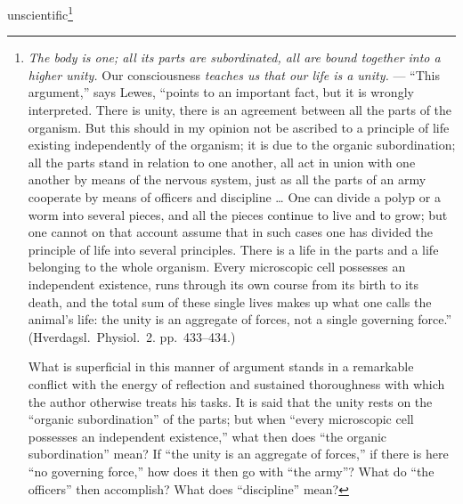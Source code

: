 \documentclass[12pt,a4paper]{book}
\begin{document}
unscientific\footnote{\emph{The body is one; all its parts are subordinated,
all are bound together into a higher unity.} Our consciousness \emph{teaches us
that our life is a unity.} --- ``This argument,'' says Lewes, ``points to an
important fact, but it
is wrongly interpreted. There is unity, there is an agreement between all the
parts of the organism. But this should in my opinion not be ascribed to a
principle of life existing independently of the organism; it is due to the
organic subordination; all the parts stand in relation to one another, all act
in union with one another by means of the nervous system, just as all the parts
of an army cooperate by means of officers and discipline \dots{} One can divide
a polyp or a worm into several pieces, and all the pieces continue to live and
to grow; but one cannot on that account assume that in such cases one has
divided the principle of life into several principles. There is a life in the
parts and a life belonging to the whole organism. Every microscopic cell
possesses an independent existence, runs through its own course from its birth
to its death, and the total sum of these single lives makes up what one calls
the animal's life: the unity is an aggregate of forces, not a single governing
force.'' (Hverdagsl.\ Physiol.\ 2. pp.~433--434.)

What is superficial in this manner of argument stands in a remarkable conflict
with the energy of reflection and sustained thoroughness with which the author
otherwise treats his tasks. It is said that the unity rests on the ``organic
subordination'' of the parts; but when ``every microscopic cell possesses an
independent existence,'' what then does ``the organic subordination'' mean? If
``the unity is an aggregate of forces,'' if there is here ``no governing
force,'' how does it then go with ``the army''? What do ``the officers'' then
accomplish? What does ``discipline'' mean?

}
\end{document}
